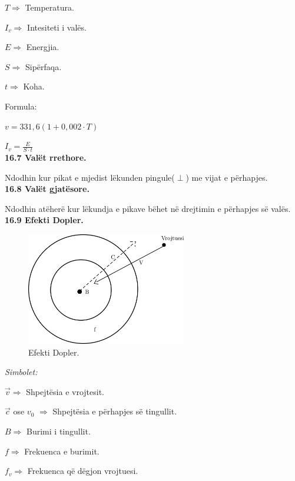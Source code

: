 \documentclass[twocolumn]{article}
\begin{document}
$T \Rightarrow $ Temperatura.

	$I_v \Rightarrow $ Intesiteti i valës.
	
	$E \Rightarrow $ Energjia.
	
	$S \Rightarrow$ Sipërfaqa.
	
	$t \Rightarrow$ Koha.

\begin{center}
	Formula:
\end{center}

$v=331,6 (1+0,002 \cdot T)$

$I_v=\frac{E}{S \cdot t}$\\

\textbf{16.7 Valët rrethore.}

Ndodhin kur pikat e mjedist lëkunden pingule($\perp$) me vijat e përhapjes.\\

\textbf{16.8 Valët gjatësore.}

Ndodhin atëherë kur lëkundja e pikave bëhet në drejtimin e përhapjes së valës.\\


\textbf{16.9 Efekti Dopler.}

	\begin{figure}[h]
	\includegraphics[width=70mm]{Imazhet/efekti dopler.png}
	\caption{Efekti Dopler.}
	\label{fig:boat1}
\end{figure}

\begin{center}
\textit{	Simbolet:}
\end{center}

$\vec{v} \Rightarrow $ Shpejtësia e vrojtesit.

$\vec{c}$ ose $ v_0 $ $ \Rightarrow $ Shpejtësia e përhapjes së tingullit.

$B \Rightarrow$ Burimi i tingullit.

$f \Rightarrow $ Frekuenca e burimit.

$f_v \Rightarrow $ Frekuenca që dëgjon vrojtuesi.
\end{document}
